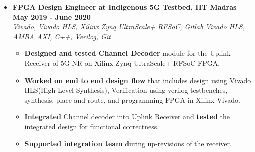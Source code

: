 \documentclass[a4paper,11pt]{article}
\newcommand{\isep}{-2 pt}
\newcommand{\spsep}{-0.75cm}
\begin{document}
\begin{itemize}
	\item \textbf{FPGA Design Engineer at Indigenous 5G Testbed, IIT Madras \hfill May 2019 - June 2020} \\
	\emph{Vivado, Vivado HLS, Xilinx Zynq UltraScale+ RFSoC, Gitlab \hfill Vivado HLS, AMBA AXI, C++, Verilog, Git} \\[\spsep]
	\begin{itemize} \itemsep \isep
		\item \textbf{Designed and tested Channel Decoder} module for the Uplink Receiver of 5G NR on Xilinx Zynq UltraScale+ RFSoC FPGA.
		\item \textbf{Worked on end to end design flow} that includes design using Vivado HLS(High Level Synthesis), Verification using verilog testbenches, synthesis, place and route, and programming FPGA in Xilinx Vivado. 
		\item \textbf{Integrated} Channel decoder into Uplink Receiver and \textbf{tested} the integrated design for functional correctness.
		\item \textbf{Supported integration team} during up-revisions of the receiver.
	\end{itemize}

\pagebreak


\end{itemize}
\end{document}
